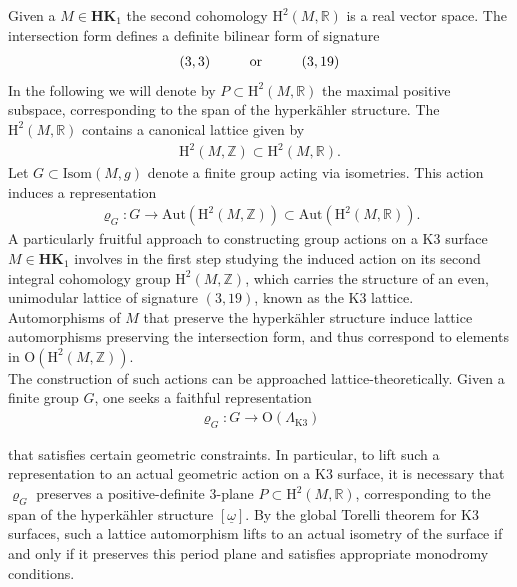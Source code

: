 \documentclass[psamsfonts]{amsart}
\theoremstyle{plain}
\theoremstyle{definition}{
\newtheorem{defi}{Definition}[section]
\newtheorem{ass}{Assumption}
\newtheorem*{nota}{Notation}}
\theoremstyle{remark}{
\newtheorem{rem}{Remark}
\newtheorem{ex}{Example}}
\theoremstyle{plain}{
\newtheorem{thm}{Theorem}[section]
\newtheorem{lem}{Lemma}[section]
\newtheorem{cor}{Corollary}[section]
\newtheorem{prop}{Proposition}[section]
\newtheorem{con}{Conjecture}[section]}
\newcommand{\m}[1]{{\mathrm{#1}}}
\newcommand{\cat}[1]{\textbf{#1}}
\newcommand{\oder}[1]{\hspace{#1}\text{or}\hspace{#1}}
\begin{document}
Given a $M\in\cat{HK}_1$ the second cohomology $\m{H}^2(M,\mathbb{R})$ is a real vector space. The intersection form defines a definite bilinear form of signature 
\begin{align*}
    (3,3)\oder{1.0cm} (3,19)
\end{align*}
In the following we will denote by $P\subset \m{H}^2(M,\mathbb{R})$ the maximal positive subspace, corresponding to the span of the hyperkähler structure. The $\m{H}^2(M,\mathbb{R})$ contains a canonical lattice given by 
\begin{align*}
    \m{H}^2(M,\mathbb{Z})\subset\m{H}^2(M,\mathbb{R}).
\end{align*}
Let $G\subset\m{Isom}(M,g)$ denote a finite group acting via isometries. This action induces a representation 
\begin{align*}
    \varrho_G\colon G\rightarrow \m{Aut}(\m{H}^2(M,\mathbb{Z}))\subset\m{Aut}(\m{H}^2(M,\mathbb{R})).
\end{align*}
A particularly fruitful approach to constructing group actions on a K3 surface $M \in \cat{HK}_1$ involves in the first step studying the induced action on its second integral cohomology group $ \m{H}^2(M, \mathbb{Z}) $, which carries the structure of an even, unimodular lattice of signature $ (3,19) $, known as the K3 lattice. Automorphisms of $ M $ that preserve the hyperkähler structure induce lattice automorphisms preserving the intersection form, and thus correspond to elements in $ \m{O}(\m{H}^2(M, \mathbb{Z})) $.\\

The construction of such actions can be approached lattice-theoretically. Given a finite group $ G $, one seeks a faithful representation
\begin{align*}
    \varrho_G\colon  G \to \m{O}(\Lambda_{\m{K3}})
\end{align*}

that satisfies certain geometric constraints. In particular, to lift such a representation to an actual geometric action on a K3 surface, it is necessary that $ \varrho_G $ preserves a positive-definite 3-plane $ P \subset \m{H}^2(M, \mathbb{R}) $, corresponding to the span of the hyperkähler structure $ [\underline{\omega}] $. By the global Torelli theorem \cite[Thm 2.4]{huybrechts2016lectures} for K3 surfaces, such a lattice automorphism lifts to an actual isometry of the surface if and only if it preserves this period plane and satisfies appropriate monodromy conditions.\\
\end{document}
